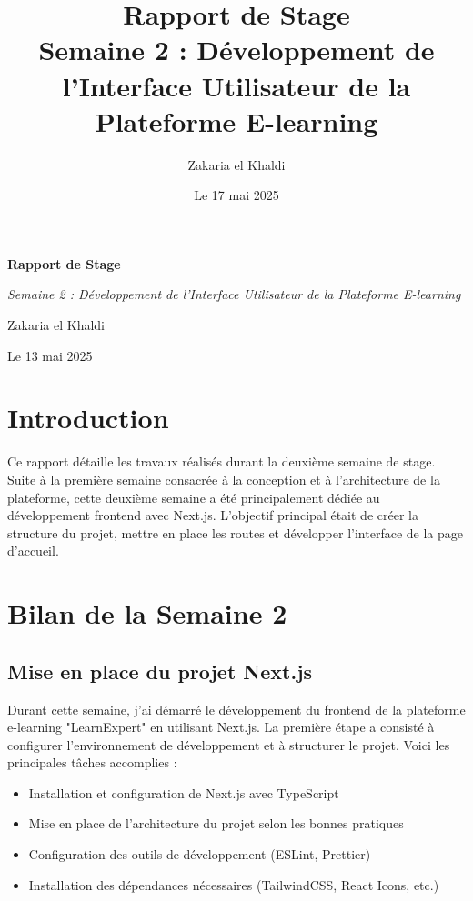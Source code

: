 \documentclass[12pt, a4paper]{article}
\title{\Huge\bfseries\color{primary} Rapport de Stage \\ 
      \Large Semaine 2 : Développement de l'Interface Utilisateur de la Plateforme E-learning}
\author{\Large Zakaria el Khaldi}
\date{\large Le 17 mai 2025}
\begin{document}
\begin{titlepage}
  \centering
  {\Huge\bfseries\color{primary} Rapport de Stage \par}
  \vspace{1cm}
  {\Large\itshape Semaine 2 : Développement de l'Interface Utilisateur de la Plateforme E-learning\par}
  \vspace{2cm}
  
  \vspace{2cm}
  {\Large Zakaria el Khaldi\par}
  \vfill
  {\large Le 13 mai 2025\par}
\end{titlepage}
\tableofcontents
\thispagestyle{empty}
\newpage
\section{Introduction}
\thispagestyle{fancy}
Ce rapport détaille les travaux réalisés durant la deuxième semaine de stage. Suite à la première semaine consacrée à la conception et à l'architecture de la plateforme, cette deuxième semaine a été principalement dédiée au développement frontend avec Next.js. L'objectif principal était de créer la structure du projet, mettre en place les routes et développer l'interface de la page d'accueil.

\section{Bilan de la Semaine 2}

\subsection{Mise en place du projet Next.js}

Durant cette semaine, j'ai démarré le développement du frontend de la plateforme e-learning "LearnExpert" en utilisant Next.js. La première étape a consisté à configurer l'environnement de développement et à structurer le projet. Voici les principales tâches accomplies :

\begin{itemize}
  \item Installation et configuration de Next.js avec TypeScript
  \item Mise en place de l'architecture du projet selon les bonnes pratiques
  \item Configuration des outils de développement (ESLint, Prettier)
  \item Installation des dépendances nécessaires (TailwindCSS, React Icons, etc.)
\end{itemize}
\end{document}
